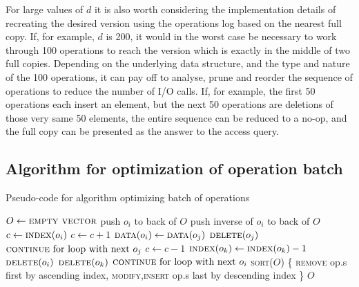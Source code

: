 For large values of $d$ it is also worth considering the implementation details
of recreating the desired version using the operations log based on the
nearest full copy. If, for example, $d$ is 200, it would in the worst case be
necessary to work through 100 operations to reach the version which is exactly
in the middle of two full copies. Depending on the underlying data structure,
and the type and nature of the 100 operations, it can pay off to analyse,
prune and reorder the sequence of operations to reduce the number of I/O calls.
If, for example, the first 50 operations each insert an element, but the next 50
operations are deletions of those very same 50 elements, the entire sequence can
be reduced to a no-op, and the full copy can be presented as the answer to the
access query.

\subsection{Algorithm for optimization of operation batch}
\begin{algorithm}
  \caption{Pseudo-code for algorithm optimizing batch of operations}
  \begin{algorithmic}[1]
      \State $O \gets \textsc{empty vector}$
          \State push $o_i$ to back of $O$
        \Else
          \State push inverse of $o_i$ to back of $O$
        \EndIf
      \EndFor
          \State $c \gets \textsc{index}(o_i)$
              \State $c \gets c+1$
              \State $\textsc{data}(o_i) \gets \textsc{data}(o_j)$
              \State $\textsc{delete}(o_j)$
              \State $\textsc{continue}\textnormal{ for loop with next }o_j$
                \State $c \gets c-1$
                  \State $\textsc{index}(o_k) \gets \textsc{index}(o_k) - 1$
                \EndFor
                \State $\textsc{delete}(o_i)$
                \State $\textsc{delete}(o_k)$
                \State $\textsc{continue}\textnormal{ for loop with next }o_i$
              \EndIf
            \EndIf
          \EndFor
        \EndIf
      \EndFor
      \Statex
      \State \textsc{sort}($O$) \{
      \State \hspace{12pt} \textsc{remove} op.s first by ascending index,
      \State \hspace{12pt} \textsc{modify},\textsc{insert} op.s last by descending index
      \State \}
      \Statex
      \State \Return $O$
    \EndFunction
  \end{algorithmic}
\end{algorithm}

